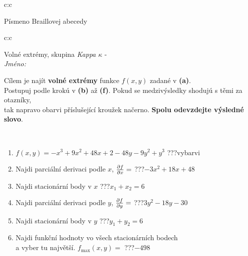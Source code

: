 \documentclass[10pt]{report}
\begin{document}
\begin{tabular}{c:c}
\begin{minipage}[c][104.5mm][t]{0.5\linewidth}
\begin{center}
\begin{minipage}{0.20\linewidth}
\begin{center}
{\small Písmeno Braillovej abecedy}
\end{center}
\end{minipage}
\end{center}
\end{minipage}
%
\end{tabular}
\newpage
\thispagestyle{empty}
\begin{tabular}{c:c}
\begin{minipage}[c][104.5mm][t]{0.5\linewidth}
\begin{center}
\vspace{7mm}
{\huge Volné extrémy, skupina \textit{Kappa $\kappa$} -}\\[5mm]
\textit{Jméno:}\phantom{xxxxxxxxxxxxxxxxxxxxxxxxxxxxxxxxxxxxxxxxxxxxxxxxxxxxxxxxxxxxxxxxx}\\[5mm]
\begin{minipage}{0.95\linewidth}
\begin{center}
Cílem je najít \textbf{volné extrémy} funkce $f(x,y)$ zadané v \textbf{(a)}.\\Postupuj podle krokú v \textbf{(b)} až \textbf{(f)}. Pokud se medzivýsledky shodujú s těmi za otazníky,\\tak napravo obarvi příslušející kroužek načerno. \textbf{Spolu odevzdejte výsledné slovo}.
\end{center}
\end{minipage}
\\[1mm]
\begin{minipage}{0.79\linewidth}
\begin{center}
\begin{varwidth}{\linewidth}
\begin{enumerate}
\normalsize
\item $f(x,y)=-x^3+9x^2+48x+2-48y-9y^2+y^3$\quad \dotfill\; ???\;\dotfill \quad vybarvi
\item Najdi parciální derivaci podle $x$, $\pdv{f}{x}=$\quad \dotfill\; ???\;\dotfill \quad $-3x^2+18x+48$
\item Najdi stacionární body v $x$\quad \dotfill\; ???\;\dotfill \quad $x_1+x_2=6$
\item Najdi parciální derivaci podle $y$, $\pdv{f}{y}=$\quad \dotfill\; ???\;\dotfill \quad $3y^2-18y-30$
\item Najdi stacionární body v $y$\quad \dotfill\; ???\;\dotfill \quad $y_1+y_2=6$
\item Najdi funkční hodnoty vo všech stacionárních bodech \\ \phantom{xxxxxx} a vyber tu najvětší. $f_{\text{max}}(x,y)=$\quad \dotfill\; ???\;\dotfill \quad $-498$

\end{enumerate}
\end{varwidth}
\end{center}
\end{minipage}
\end{center}
\end{minipage}
\end{tabular}
\end{document}
